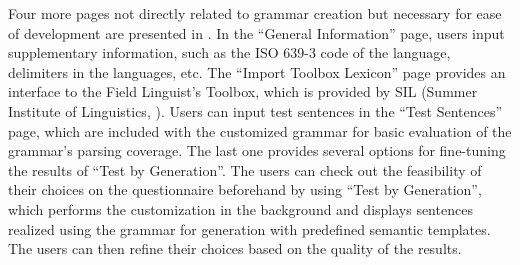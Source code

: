 


Four more pages not directly related to grammar creation but necessary
for ease of development are presented in .
In the ``General Information'' page, users input supplementary
information, such as the ISO 639-3 code of the language, delimiters in
the languages, etc. The ``Import Toolbox Lexicon'' page provides an
interface to the Field Linguist's Toolbox, which is provided by SIL
(Summer Institute of Linguistics, ).  Users
can input test sentences in the ``Test Sentences'' page, which are
included with the customized grammar for basic evaluation of the
grammar's parsing coverage. The last one provides several options for
fine-tuning the results of ``Test by Generation''.  The users can
check out the feasibility of their choices on the questionnaire
beforehand by using ``Test by Generation'', which performs the
customization in the background and displays sentences realized using
the grammar for generation with predefined semantic templates. The
users can then refine their choices based on the quality of the
results.


